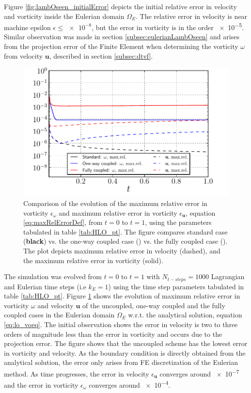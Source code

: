 Figure \ref{fig:lambOseen_initialError} depicts the initial relative error in velocity and vorticity inside the Eulerian domain $\Omega_E$. The relative error in velocity is near machine epsilon $\epsilon \le \num{e-8}$, but the error in vorticity is in the order \num{e-5}. Similar observation was made in section \ref{subsec:eulerianLambOseen} and arises from the projection error of the Finite Element when determining the vorticity $\omega$ from velocity $\mathbf{u}$, described in section \ref{subsec:dtvf}. 

	\begin{figure}[!t]
	\centering
	\includegraphics[width=0.6\linewidth]{./figures/hybrid/lambOseen/lambOseen_comparision_compressed.pdf}
	\caption{Comparison of the evolution of the maximum relative error in vorticity $\epsilon_{\omega}$ and maximum relative error in vorticity $\epsilon_{\mathbf{u}}$, equation \ref{eq:maxRelErrorDef}, from $t=0$ to $t=1$, using the parameters tabulated in table \ref{tab:HLO_pt}. The figure compares standard case (\textbf{black}) vs. the one-way coupled case ({}) vs. the fully coupled case ({}). The plot depicts maximum relative error in velocity (dashed), and the maximum relative error in vorticity (solid).}
	\label{fig:lambOseen_comparison}
	\end{figure}

The simulation was evolved from $t=0$ to $t=1$ with $N_{t-steps} = 1000$ Lagrangian and Eulerian time steps (i.e $k_E = 1$) using the time step parameters tabulated in table \ref{tab:HLO_pt}. Figure \ref{fig:lambOseen_comparison} shows the evolution of maximum relative error in vorticity $\omega$ and velocity $\mathbf{u}$ of the uncoupled, one-way coupled and the fully coupled cases in the Eulerian domain $\Omega_E$ w.r.t. the analytical solution, equation \ref{eq:lo_voeq}. The initial observation shows the error in velocity is two to three orders of magnitude less than the error in vorticity and occurs due to the projection error. The figure shows that the uncoupled scheme has the lowest error in vorticity and velocity. As the boundary condition is directly obtained from the analytical solution, the error only arises from FE discretization of the Eulerian method. As time progresses, the error in velocity $\epsilon_{\mathbf{u}}$ converges around \num{e-7} and the error in vorticity $\epsilon_{\omega}$ converges around \num{e-4}.

